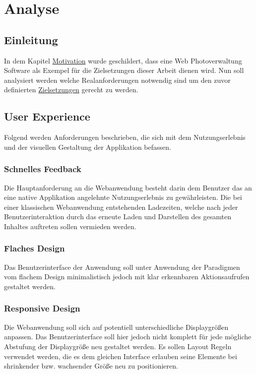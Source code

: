 \chapter{Analyse}

\section{Einleitung}

In dem Kapitel \hyperref[sec:motivation]{Motivation} wurde geschildert, dass eine Web Photoverwaltung Software als Exempel für die Zielsetzungen dieser Arbeit dienen wird. Nun soll analysiert werden welche Realanforderungen notwendig sind um den zuvor definierten \hyperref[sec:zielsetzung]{Zielsetzungen} gerecht zu werden.

\section{User Experience}

Folgend werden Anforderungen beschrieben, die sich mit dem Nutzungserlebnis und der visuellen Gestaltung der Applikation befassen.

\subsection{Schnelles Feedback}

Die Hauptanforderung an die Webanwendung besteht darin dem Benutzer das an eine native Applikation angelehnte Nutzungserlebnis zu gewährleisten. Die bei einer
klassischen Webanwendung entstehenden Ladezeiten, welche nach jeder Benutzerinteraktion durch das erneute Laden und Darstellen des gesamten Inhaltes
auftreten sollen vermieden werden.

\subsection{Flaches Design}

Das Benutzerinterface der Anwendung soll unter Anwendung der Paradigmen vom flachem Design minimalistisch jedoch mit klar erkennbaren Aktionsaufrufen gestaltet werden.

\subsection{Responsive Design}

Die Webanwendung soll sich auf potentiell unterschiedliche Displaygrößen anpassen. Das Benutzerinterface soll hier jedoch nicht komplett für jede
mögliche Abstufung der Displaygröße neu gestaltet werden. Es sollen Layout Regeln verwendet werden, die es dem gleichen Interface erlauben seine Elemente
bei shrinkender bzw. wachsender Größe neu zu positionieren.  

